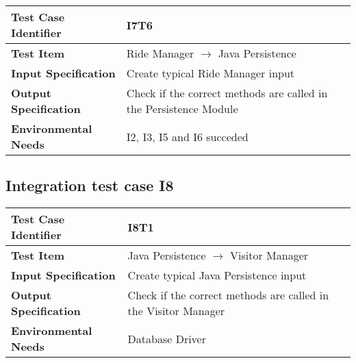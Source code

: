 \begin{table}[!htbp]
\begin{center}
\begin{tabular}[t]{p{}p{}}

\hline
\textbf{Test Case Identifier} & I7T6 \\
\hline
\textbf{Test Item} & Ride Manager $\rightarrow$ Java Persistence \\
\hline
\textbf{Input Specification} & Create typical Ride Manager input \\
\hline
\textbf{Output Specification} & Check if the correct methods are called in the Persistence Module \\
\hline
\textbf{Environmental Needs} & I2, I3, I5 and I6 succeded \\
\hline

\end{tabular}
\end{center}
\end{table}
\clearpage

\subsection{Integration test case I8}

\begin{table}[!htbp]
\begin{center}
\begin{tabular}[t]{p{}p{}}

\hline
\textbf{Test Case Identifier} & I8T1 \\
\hline
\textbf{Test Item} & Java Persistence $\rightarrow$ Visitor Manager \\
\hline
\textbf{Input Specification} & Create typical Java Persistence input  \\
\hline
\textbf{Output Specification} & Check if the correct methods are called in the Visitor Manager \\
\hline
\textbf{Environmental Needs} & Database Driver \\
\hline

\end{tabular}
\end{center}
\end{table}

